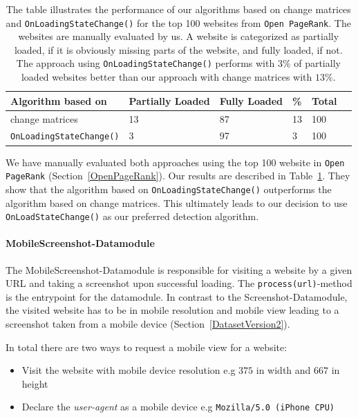\begin{table}
	\centering
	\begin{tabularx}{\textwidth}{l l l l l l}
		Algorithm based on & Partially Loaded & Fully Loaded & \%  & Total \\ \hline \hline
		change matrices & 13 & 87 & 13 & 100 \\ \hline
		\texttt{OnLoadingStateChange()} & 3 &  97 & 3 & 100
	\end{tabularx}
	\caption[Performance of algorithms for detecting website loading completion]{The table illustrates the performance of our algorithms based on change matrices and \texttt{OnLoadingStateChange()} for the top 100 websites from \texttt{Open PageRank}. The websites are manually evaluated by us. A website is categorized as partially loaded, if it is obviously missing parts of the website, and fully loaded, if not. The approach using \texttt{OnLoadingStateChange()} performs with $3\%$ of partially loaded websites better than our approach with change matrices with $13\%$. }
	\label{table_compare_algorithm_screenshot}
\end{table}

We have manually evaluated both approaches using the top 100 website in \texttt{Open PageRank} (Section~\ref{OpenPageRank}). Our results are described in Table~\ref{table_compare_algorithm_screenshot}. They show that the algorithm based on \texttt{OnLoadingStateChange()} outperforms the algorithm based on change matrices. This ultimately leads to our decision to use \texttt{OnLoadStateChange()} as our preferred detection algorithm.

\paragraph*{MobileScreenshot-Datamodule}
\label{datacrawler_mobilescreenshot_datamodule}
The MobileScreenshot-Datamodule is responsible for visiting a website by a given URL and taking a screenshot upon successful loading. The \texttt{process(url)}-method is the entrypoint for the datamodule. In contrast to the Screenshot-Datamodule, the visited website has to be in mobile resolution and mobile view leading to a screenshot taken from a mobile device (Section~\ref{DatasetVersion2}).

In total there are two ways to request a mobile view for a website:

\begin{itemize}
	\item Visit the website with mobile device resolution e.g $375$ in width and $667$ in height
	\item Declare the \textit{user-agent} as a mobile device e.g  \texttt{Mozilla/5.0 (iPhone CPU)}
\end{itemize}

